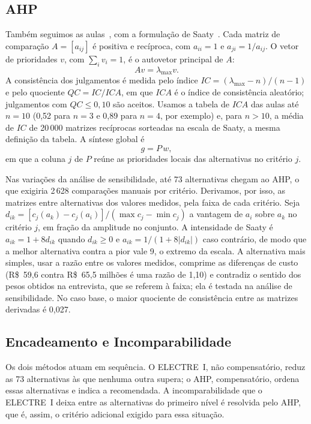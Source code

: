 \documentclass[conference]{IEEEtran}
\begin{document}
\subsection{AHP}\label{sec:ahp}

Também seguimos as aulas~\cite{aula10}, com a formulação de Saaty~\cite{saaty1994}. Cada matriz de comparação $A=[a_{ij}]$ é positiva e recíproca, com $a_{ii}=1$ e $a_{ji}=1/a_{ij}$. O vetor de prioridades $v$, com $\sum_i v_i=1$, é o autovetor principal de $A$:
\begin{equation}
A v=\lambda_{\max} v.
\end{equation}
A consistência dos julgamentos é medida pelo índice $IC=(\lambda_{\max}-n)/(n-1)$ e pelo quociente $QC=IC/ICA$, em que $ICA$ é o índice de consistência aleatório; julgamentos com $QC\leq 0{,}10$ são aceitos. Usamos a tabela de $ICA$ das aulas até $n=10$ (0{,}52 para $n=3$ e 0{,}89 para $n=4$, por exemplo) e, para $n>10$, a média de $IC$ de 20\,000 matrizes recíprocas sorteadas na escala de Saaty, a mesma definição da tabela. A síntese global é
\begin{equation}
g = P\,w,
\end{equation}
em que a coluna $j$ de $P$ reúne as prioridades locais das alternativas no critério $j$.

Nas variações da análise de sensibilidade, até 73 alternativas chegam ao AHP, o que exigiria 2\,628 comparações manuais por critério. Derivamos, por isso, as matrizes entre alternativas dos valores medidos, pela faixa de cada critério. Seja $d_{ik}=[c_j(a_k)-c_j(a_i)]/(\max c_j-\min c_j)$ a vantagem de $a_i$ sobre $a_k$ no critério $j$, em fração da amplitude no conjunto. A intensidade de Saaty é $a_{ik}=1+8d_{ik}$ quando $d_{ik}\geq0$ e $a_{ik}=1/(1+8|d_{ik}|)$ caso contrário, de modo que a melhor alternativa contra a pior vale 9, o extremo da escala. A alternativa mais simples, usar a razão entre os valores medidos, comprime as diferenças de custo (R\$~59{,}6 contra R\$~65{,}5 milhões é uma razão de 1{,}10) e contradiz o sentido dos pesos obtidos na entrevista, que se referem à faixa; ela é testada na análise de sensibilidade. No caso base, o maior quociente de consistência entre as matrizes derivadas é 0{,}027.

\subsection{Encadeamento e Incomparabilidade}\label{sec:encadeamento}

Os dois métodos atuam em sequência. O ELECTRE~I, não compensatório, reduz as 73 alternativas às que nenhuma outra supera; o AHP, compensatório, ordena essas alternativas e indica a recomendada. A incomparabilidade que o ELECTRE~I deixa entre as alternativas do primeiro nível é resolvida pelo AHP, que é, assim, o critério adicional exigido para essa situação.
\end{document}

